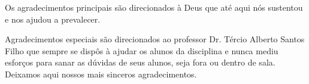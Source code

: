 Os agradecimentos principais são direcionados à  Deus que até aqui nós sustentou e nos ajudou a prevalecer.

Agradecimentos especiais são direcionados ao professor Dr. Tércio Alberto Santos Filho que sempre se dispôs à ajudar os alunos da disciplina e nunca mediu esforços para sanar as dúvidas de seus alunos, seja fora ou dentro de sala. Deixamos aqui nossos mais sinceros agradecimentos.

